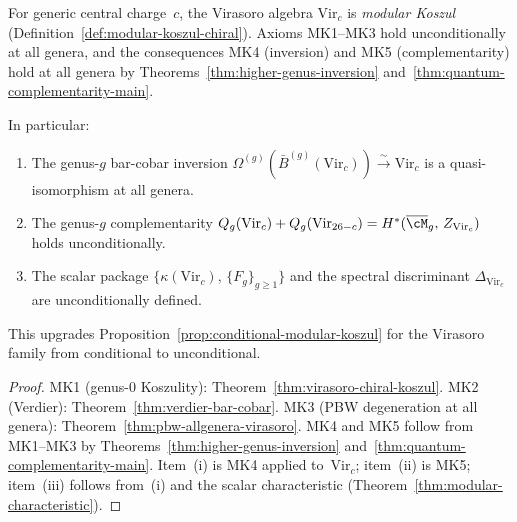\begin{corollary}
\label{cor:unconditional-allgenera-virasoro}
For generic central charge~$c$, the Virasoro algebra
$\mathrm{Vir}_c$ is \emph{modular Koszul}
\textup{(}Definition~\textup{\ref{def:modular-koszul-chiral})}.
Axioms \textup{MK1--MK3} hold unconditionally at all genera, and the
consequences \textup{MK4} \textup{(}inversion\textup{)}
and \textup{MK5} \textup{(}complementarity\textup{)} hold
at all genera by
Theorems~\textup{\ref{thm:higher-genus-inversion}}
and~\textup{\ref{thm:quantum-complementarity-main}}.

In particular:
\begin{enumerate}[label=\textup{(\roman*)}]
\item The genus-$g$ bar-cobar inversion
$\Omega^{(g)}(\bar{B}^{(g)}(\mathrm{Vir}_c))
\xrightarrow{\sim} \mathrm{Vir}_c$
is a quasi-isomorphism at all genera.
\item The genus-$g$ complementarity
$Q_g(\mathrm{Vir}_c) + Q_g(\mathrm{Vir}_{26-c})
= H^*(\overline{\cM}_g,\, Z_{\mathrm{Vir}_c})$
holds unconditionally.
\item The scalar package
$\{\kappa(\mathrm{Vir}_c),\, \{F_g\}_{g \geq 1}\}$ and the
spectral discriminant $\Delta_{\mathrm{Vir}_c}$ are
unconditionally defined.
\end{enumerate}
This upgrades
Proposition~\textup{\ref{prop:conditional-modular-koszul}}
for the Virasoro family from conditional to unconditional.
\end{corollary}

\begin{proof}
MK1 (genus-$0$ Koszulity):
Theorem~\ref{thm:virasoro-chiral-koszul}.
MK2 (Verdier):
Theorem~\ref{thm:verdier-bar-cobar}.
MK3 (PBW degeneration at all genera):
Theorem~\ref{thm:pbw-allgenera-virasoro}.
MK4 and MK5 follow from MK1--MK3 by
Theorems~\ref{thm:higher-genus-inversion}
and~\ref{thm:quantum-complementarity-main}.
Item~(i) is MK4 applied to~$\mathrm{Vir}_c$;
item~(ii) is MK5;
item~(iii) follows from~(i) and the
scalar characteristic
(Theorem~\ref{thm:modular-characteristic}).
\end{proof}

